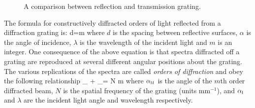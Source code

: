 \begin{figure}[!bht]\centering
{}
\hfill
{}
\caption{A comparison between reflection and transmission grating.}
\end{figure}

The formula for constructively diffracted orders of light reflected from a diffraction grating is:
\mate
d\sin\alpha=m\lambda
\label{gianfrancioschio}
\atem
where $d$ is the spacing between reflective surfaces, $\alpha$ is the angle of incidence, $\lambda$ is the wavelength of the incident light and $m$ is an integer. One consequence of the above equation is that spectra diffracted off a grating are reproduced at several different angular positions about the grating. The various replications of the spectra are called \textit{orders of diffraction} and obey the following relationship 
\mate
\sin\alpha_{} + \sin\alpha_{}= N m \lambda
\atem
where $\alpha_{\mbox{\footnotesize{\scshape{m}}}}$ is the angle of the $m$th order diffracted beam, $N$ is the spatial frequency of the grating (units mm$^{-1}$), and $\alpha_{\mbox{\footnotesize{\scshape{i}}}}$ and $\lambda$ are the incident light angle and wavelength respectively.

